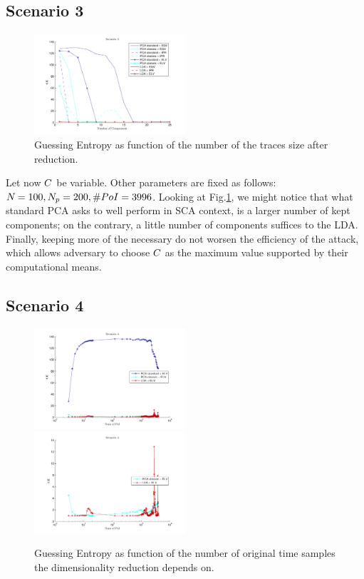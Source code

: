 \subsection{Scenario 3}
\begin{figure}
\centering
\includegraphics[width=0.5\textwidth]{figures/Criterion3.pdf}
\caption{Guessing Entropy as function of the number of the traces size after reduction.}\label{fig:3}
\end{figure}


Let now $\newTraceLength$ be variable. Other parameters are fixed as follows: $\numTraces[] = 100, N_p=200, \numPoI = 3996$. Looking at Fig.\ref{fig:3}, we might notice that what standard PCA asks to well perform in SCA context, is a larger number of kept components; on the contrary, a little number of components suffices to the LDA. Finally, keeping more of the necessary do not worsen the efficiency of the attack, which allows adversary to choose $\newTraceLength$ as the maximum value supported by their computational means.



\subsection{Scenario 4}
\begin{figure}
\includegraphics[width=0.5\textwidth]{figures/Criterion4.pdf}
\includegraphics[width=0.5\textwidth]{figures/Criterion4cutted.pdf} 
\caption{Guessing Entropy as function of the number of original time samples the dimensionality reduction depends on.}\label{fig:4}
\end{figure}

